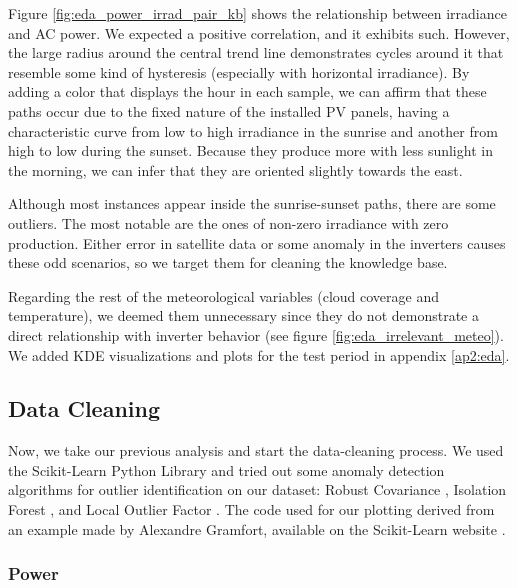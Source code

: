 Figure \ref{fig:eda_power_irrad_pair_kb} shows the relationship between irradiance and AC power. We expected a positive correlation, and it exhibits such. However, the large radius around the central trend line demonstrates cycles around it that resemble some kind of hysteresis (especially with horizontal irradiance). By adding a color that displays the hour in each sample, we can affirm that these paths occur due to the fixed nature of the installed PV panels, having a characteristic curve from low to high irradiance in the sunrise and another from high to low during the sunset. Because they produce more with less sunlight in the morning, we can infer that they are oriented slightly towards the east.

Although most instances appear inside the sunrise-sunset paths, there are some outliers. The most notable are the ones of non-zero irradiance with zero production. Either error in satellite data or some anomaly in the inverters causes these odd scenarios, so we target them for cleaning the knowledge base.

Regarding the rest of the meteorological variables (cloud coverage and temperature), we deemed them unnecessary since they do not demonstrate a direct relationship with inverter behavior (see figure \ref{fig:eda_irrelevant_meteo}). We added KDE visualizations and plots for the test period in appendix \ref{ap2:eda}.


\subsection{Data Cleaning}

Now, we take our previous analysis and start the data-cleaning process. We used the Scikit-Learn Python Library and tried out some anomaly detection algorithms for outlier identification on our dataset: Robust Covariance \cite{Rousseeuw1999}, Isolation Forest \cite{Liu2008} \cite{Liu2012}, and Local Outlier Factor \cite{Breunig2000}. The code used for our plotting derived from an example made by Alexandre Gramfort, available on the Scikit-Learn website \cite{sklearn_example}.

\subsubsection{Power}

